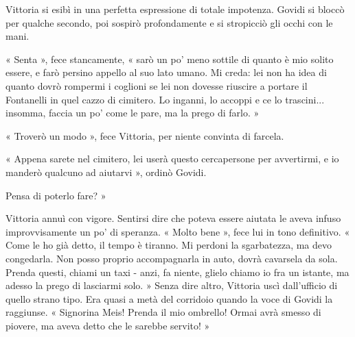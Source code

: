 Vittoria si esibì in una perfetta espressione di totale impotenza. Govidi si bloccò per qualche secondo, poi sospirò profondamente e si stropicciò gli occhi con le mani.

« Senta », fece stancamente, « sarò un po' meno sottile di quanto è mio solito essere, e farò persino appello al suo lato umano. Mi creda: lei non ha idea di quanto dovrò rompermi i coglioni se lei non dovesse riuscire a portare il Fontanelli in quel cazzo di cimitero. Lo inganni, lo accoppi e ce lo trascini... insomma, faccia un po' come le pare, ma la prego di farlo. »

« Troverò un modo », fece Vittoria, per niente convinta di farcela.

« Appena sarete nel cimitero, lei userà questo cercapersone per avvertirmi, e io manderò qualcuno ad aiutarvi », ordinò Govidi. 

Pensa di poterlo fare? »

Vittoria annuì con vigore. Sentirsi dire che poteva essere aiutata le aveva infuso improvvisamente un po' di speranza.
« Molto bene », fece lui in tono definitivo. « Come le ho già detto, il tempo è tiranno. Mi perdoni la sgarbatezza, ma devo congedarla. Non posso proprio accompagnarla in auto, dovrà cavarsela da sola. Prenda questi, chiami un taxi - anzi, fa niente, glielo chiamo io fra un istante, ma adesso la prego di lasciarmi solo. »
Senza dire altro, Vittoria uscì dall'ufficio di quello strano tipo.
Era quasi a metà del corridoio quando la voce di Govidi la raggiunse. « Signorina Meis! Prenda il mio ombrello! Ormai avrà smesso di piovere, ma aveva detto che le sarebbe servito! »
